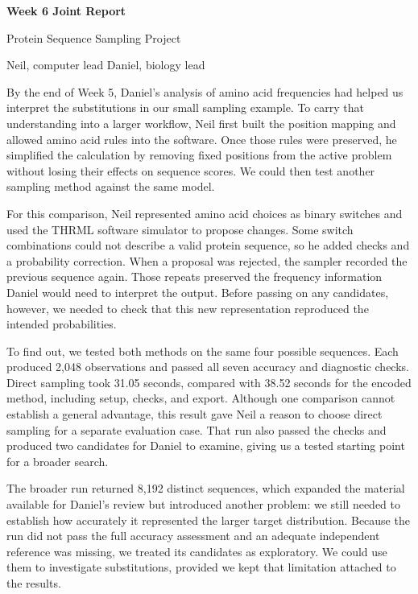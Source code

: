 \documentclass[11pt,letterpaper]{article}
\begin{document}
\thispagestyle{plain}

{\LARGE\bfseries Week 6 Joint Report\par}
\vspace{3pt}
{\large Protein Sequence Sampling Project\par}
\vspace{5pt}
{\normalsize Neil, computer lead \qquad Daniel, biology lead\par}
\vspace{10pt}

By the end of Week 5, Daniel's analysis of amino acid frequencies had helped us interpret the substitutions in our small sampling example. To carry that understanding into a larger workflow, Neil first built the position mapping and allowed amino acid rules into the software. Once those rules were preserved, he simplified the calculation by removing fixed positions from the active problem without losing their effects on sequence scores. We could then test another sampling method against the same model.

For this comparison, Neil represented amino acid choices as binary switches and used the THRML software simulator to propose changes. Some switch combinations could not describe a valid protein sequence, so he added checks and a probability correction. When a proposal was rejected, the sampler recorded the previous sequence again. Those repeats preserved the frequency information Daniel would need to interpret the output. Before passing on any candidates, however, we needed to check that this new representation reproduced the intended probabilities.

To find out, we tested both methods on the same four possible sequences. Each produced 2,048 observations and passed all seven accuracy and diagnostic checks. Direct sampling took 31.05 seconds, compared with 38.52 seconds for the encoded method, including setup, checks, and export. Although one comparison cannot establish a general advantage, this result gave Neil a reason to choose direct sampling for a separate evaluation case. That run also passed the checks and produced two candidates for Daniel to examine, giving us a tested starting point for a broader search.

The broader run returned 8,192 distinct sequences, which expanded the material available for Daniel's review but introduced another problem: we still needed to establish how accurately it represented the larger target distribution. Because the run did not pass the full accuracy assessment and an adequate independent reference was missing, we treated its candidates as exploratory. We could use them to investigate substitutions, provided we kept that limitation attached to the results.
\end{document}
